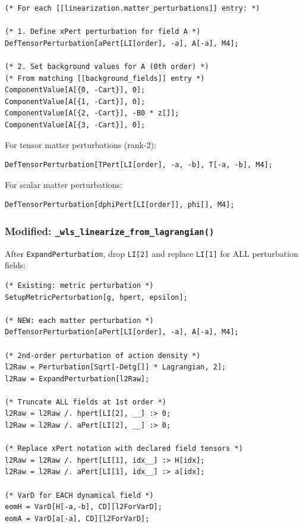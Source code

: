 \begin{lstlisting}[style=mathematica]
(* For each [[linearization.matter_perturbations]] entry: *)

(* 1. Define xPert perturbation for field A *)
DefTensorPerturbation[aPert[LI[order], -a], A[-a], M4];

(* 2. Set background values for A (0th order) *)
(* From matching [[background_fields]] entry *)
ComponentValue[A[{0, -Cart}], 0];
ComponentValue[A[{1, -Cart}], 0];
ComponentValue[A[{2, -Cart}], -B0 * z[]];
ComponentValue[A[{3, -Cart}], 0];
\end{lstlisting}

For tensor matter perturbations (rank-2):
\begin{lstlisting}[style=mathematica]
DefTensorPerturbation[TPert[LI[order], -a, -b], T[-a, -b], M4];
\end{lstlisting}

For scalar matter perturbations:
\begin{lstlisting}[style=mathematica]
DefTensorPerturbation[dphiPert[LI[order]], phi[], M4];
\end{lstlisting}

\subsubsection{Modified: \texttt{\_wls\_linearize\_from\_lagrangian()}}
\label{sec:mfp-wls-linearize}

After \texttt{ExpandPerturbation}, drop \texttt{LI[2]} and replace \texttt{LI[1]} for ALL perturbation fields:

\begin{lstlisting}[style=mathematica]
(* Existing: metric perturbation *)
SetupMetricPerturbation[g, hpert, epsilon];

(* NEW: each matter perturbation *)
DefTensorPerturbation[aPert[LI[order], -a], A[-a], M4];

(* 2nd-order perturbation of action density *)
l2Raw = Perturbation[Sqrt[-Detg[]] * Lagrangian, 2];
l2Raw = ExpandPerturbation[l2Raw];

(* Truncate ALL fields at 1st order *)
l2Raw = l2Raw /. hpert[LI[2], __] :> 0;
l2Raw = l2Raw /. aPert[LI[2], __] :> 0;

(* Replace xPert notation with declared field tensors *)
l2Raw = l2Raw /. hpert[LI[1], idx__] :> H[idx];
l2Raw = l2Raw /. aPert[LI[1], idx__] :> a[idx];

(* VarD for EACH dynamical field *)
eomH = VarD[H[-a,-b], CD][l2ForVarD];
eomA = VarD[a[-a], CD][l2ForVarD];
\end{lstlisting}

